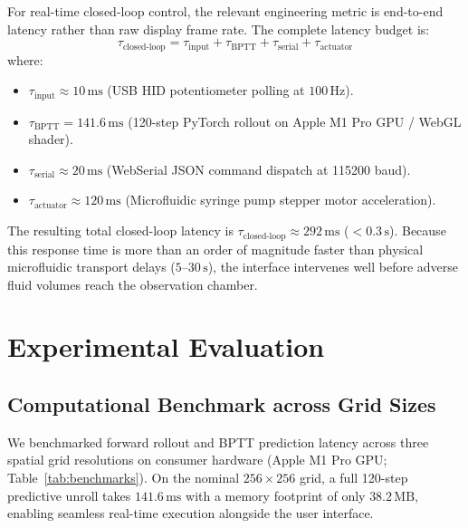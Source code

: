 \documentclass[letterpaper]{article}
\begin{document}
For real-time closed-loop control, the relevant engineering metric is end-to-end latency rather than raw display frame rate. The complete latency budget is:
\begin{equation}
\tau_{\text{closed-loop}} = \tau_{\text{input}} + \tau_{\text{BPTT}} + \tau_{\text{serial}} + \tau_{\text{actuator}}
\end{equation}
where:
\begin{itemize}
    \item $\tau_{\text{input}} \approx 10\,\text{ms}$ (USB HID potentiometer polling at $100\,\text{Hz}$).
    \item $\tau_{\text{BPTT}} = 141.6\,\text{ms}$ (120-step PyTorch rollout on Apple M1 Pro GPU / WebGL shader).
    \item $\tau_{\text{serial}} \approx 20\,\text{ms}$ (WebSerial JSON command dispatch at 115200 baud).
    \item $\tau_{\text{actuator}} \approx 120\,\text{ms}$ (Microfluidic syringe pump stepper motor acceleration).
\end{itemize}
The resulting total closed-loop latency is $\tau_{\text{closed-loop}} \approx 292\,\text{ms}$ ($<0.3\,\text{s}$). Because this response time is more than an order of magnitude faster than physical microfluidic transport delays ($5\text{--}30\,\text{s}$), the interface intervenes well before adverse fluid volumes reach the observation chamber.

\section{Experimental Evaluation}

\subsection{Computational Benchmark across Grid Sizes}

We benchmarked forward rollout and BPTT prediction latency across three spatial grid resolutions on consumer hardware (Apple M1 Pro GPU; Table~\ref{tab:benchmarks}). On the nominal $256 \times 256$ grid, a full 120-step predictive unroll takes $141.6\,\text{ms}$ with a memory footprint of only $38.2\,\text{MB}$, enabling seamless real-time execution alongside the user interface.
\end{document}

